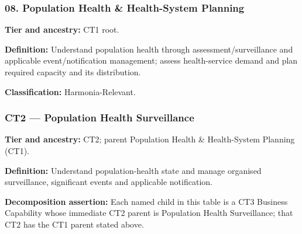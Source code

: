 \subsubsection*{08. Population Health \& Health-System Planning}
\label{rad:business:592}

\textbf{Tier and ancestry:} CT1 root.

\label{rad:business:594}

\textbf{Definition:} Understand population health through assessment/\allowbreak{}surveillance and applicable event/\allowbreak{}notification management; assess health-service demand and plan required capacity and its distribution.

\label{rad:business:596}

\textbf{Classification:} Harmonia-Relevant.

\label{rad:business:598}
\subsubsection*{CT2 — Population Health Surveillance}
\label{rad:business:600}

\textbf{Tier and ancestry:} CT2; parent Population Health \& Health-System Planning (CT1).

\label{rad:business:602}

\textbf{Definition:} Understand population-health state and manage organised surveillance, significant events and applicable notification.

\label{rad:business:604}

\textbf{Decomposition assertion:} Each named child in this table is a CT3 Business Capability whose immediate CT2 parent is Population Health Surveillance; that CT2 has the CT1 parent stated above.

